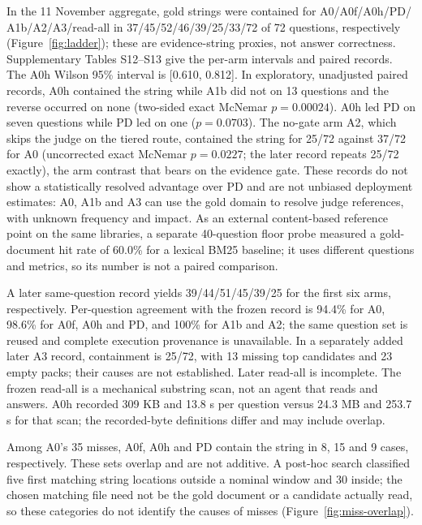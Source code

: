 In the 11 November aggregate, gold strings were contained for A0/A0f/A0h/PD/
A1b/A2/A3/read-all in 37/45/52/46/39/25/33/72 of 72 questions, respectively
(Figure~\ref{fig:ladder}); these are evidence-string proxies, not answer
correctness. Supplementary Tables S12--S13 give the per-arm intervals and
paired records. The A0h Wilson 95\% interval is [0.610, 0.812]. In exploratory,
unadjusted paired records, A0h contained the string while A1b did not on 13
questions and the reverse occurred on none (two-sided exact McNemar
$p=0.00024$). A0h led PD on seven questions while PD led on one
($p=0.0703$). The no-gate arm A2, which skips the judge on the tiered route,
contained the string for 25/72 against 37/72 for A0 (uncorrected exact McNemar
$p=0.0227$; the later record repeats 25/72 exactly), the arm contrast that
bears on the evidence gate. These records do not show a statistically resolved advantage
over PD and are not unbiased deployment estimates: A0, A1b and A3 can use
the gold domain to resolve judge references, with unknown frequency and impact.
As an external content-based reference point on the same libraries, a separate
40-question floor probe measured a gold-document hit rate of 60.0\% for a
lexical BM25 baseline; it uses different questions and metrics, so its number
is not a paired comparison.

A later same-question record yields 39/44/51/45/39/25 for the first six arms,
respectively. Per-question agreement with the frozen record is 94.4\% for A0,
98.6\% for A0f, A0h and PD, and 100\% for A1b and A2; the same question set
is reused and complete execution provenance is unavailable. In a separately
added later A3 record, containment is 25/72, with 13 missing top candidates
and 23 empty packs; their causes are not established. Later read-all is
incomplete. The frozen read-all is a mechanical substring scan, not an agent
that reads and answers. A0h recorded 309 KB and 13.8 s per question versus
24.3 MB and 253.7 s for that scan; the recorded-byte definitions differ and
may include overlap.

Among A0's 35 misses, A0f, A0h and PD contain the string in 8, 15 and 9 cases,
respectively. These sets overlap and are not additive. A post-hoc search
classified five first matching string locations outside a nominal window and
30 inside; the chosen matching file need not be the gold document or a
candidate actually read, so these categories do not identify the causes of
misses (Figure~\ref{fig:miss-overlap}).

